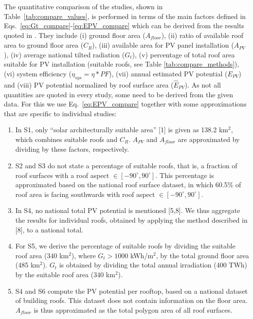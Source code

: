 
The quantitative comparison of the studies, shown in Table~\ref{tab:compare_values}, is performed in terms of the main factors defined in Eqs.~\ref{eq:Gt_compare}-\ref{eq:EPV_compare} which can be derived from the results quoted in \cite{iea_potential_2002,assouline_quantifying_2017,assouline_large-scale_2018,klauser_solarpotentialanalyse_2016,buffat_scalable_2018, walch_big_2020}. They include (i) ground floor area ($A_{\mathit{floor}}$), (ii) ratio of available roof area to ground floor area ($C_R$), (iii) available area for PV panel installation ($A_{PV}$), (iv) average national tilted radiation ($G_t$), (v) percentage of total roof area suitable for PV installation (suitable roofs, see Table \ref{tab:compare_methods}), (vi) system efficiency ($\eta_{sys} = \eta * \mathit{PF}$), (vii) annual estimated PV potential ($E_{PV}$) and (viii) PV potential normalized by roof surface area ($\hat{E}_{PV}$). As not all quantities are quoted in every study, some need to be derived from the given data. For this we use Eq.~\ref{eq:EPV_compare} together with some approximations that are specific to individual studies:

\begin{enumerate}[label=(\alph*)]
    \item In S1, only “solar architecturally suitable area” [1] is given as 138.2 km$^2$, which combines suitable roofs and $C_R$. $A_{PV}$ and $A_{\mathit{floor}}$ are approximated by dividing by these factors, respectively.
    \item S2 and S3 do not state a percentage of suitable roofs, that is, a fraction of roof surfaces with a roof aspect $\in [-90^\circ, 90^\circ]$. This percentage is approximated based on the national roof surface dataset, in which 60.5\% of roof area is facing southwards with roof aspect $\in [-90^\circ, 90^\circ]$.
	\item In S4, no national total PV potential is mentioned [5,8]. We thus aggregate the results for individual roofs, obtained by applying the method described in [8], to a national total.
	\item For S5, we derive the percentage of suitable roofs by dividing the suitable roof area (340 km$^2$), where $G_t > 1000$ kWh/m$^2$, by the total ground floor area (485 km$^2$). $G_t$ is obtained by dividing the total annual irradiation (400 TWh) by the suitable roof area (340 km$^2$).  
	\item S4 and S6 compute the PV potential per rooftop, based on a national dataset of building roofs. This dataset does not contain information on the floor area. $A_{\mathit{floor}}$ is thus approximated as the total polygon area of all roof surfaces.
\end{enumerate}
	
